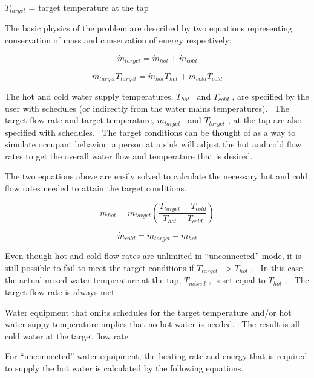 \({T_{target}}\) = target temperature at the tap

The basic physics of the problem are described by two equations representing conservation of mass and conservation of energy respectively:

\begin{equation}
{\dot m_{target}} = {\dot m_{hot}} + {\dot m_{cold}}
\end{equation}

\begin{equation}
{\dot m_{target}}{T_{target}} = {\dot m_{hot}}{T_{hot}} + {\dot m_{cold}}{T_{cold}}
\end{equation}

The hot and cold water supply temperatures, \({T_{hot}}\) ~and \({T_{cold}}\) , are specified by the user with schedules (or indirectly from the water mains temperatures).~ The target flow rate and target temperature, \({\dot m_{target}}\) ~and \({T_{target}}\) , at the tap are also specified with schedules.~ The target conditions can be thought of as a way to simulate occupant behavior; a person at a sink will adjust the hot and cold flow rates to get the overall water flow and temperature that is desired.

The two equations above are easily solved to calculate the necessary hot and cold flow rates needed to attain the target conditions.

\begin{equation}
{\dot m_{hot}} = {\dot m_{target}}\left( {\frac{{{T_{target}} - {T_{cold}}}}{{{T_{hot}} - {T_{cold}}}}} \right)
\end{equation}

\begin{equation}
{\dot m_{cold}} = {\dot m_{target}} - {\dot m_{hot}}
\end{equation}

Even though hot and cold flow rates are unlimited in ``unconnected'' mode, it is still possible to fail to meet the target conditions if \({T_{target}}\) ~\textgreater{} \({T_{hot}}\) .~ In this case, the actual mixed water temperature at the tap, \({T_{mixed}}\) , is set equal to \({T_{hot}}\) .~ The target flow rate is always met.

Water equipment that omits schedules for the target temperature and/or hot water suppy temperature implies that no hot water is needed.~ The result is all cold water at the target flow rate.

For ``unconnected'' water equipment, the heating rate and energy that is required to supply the hot water is calculated by the following equations.

